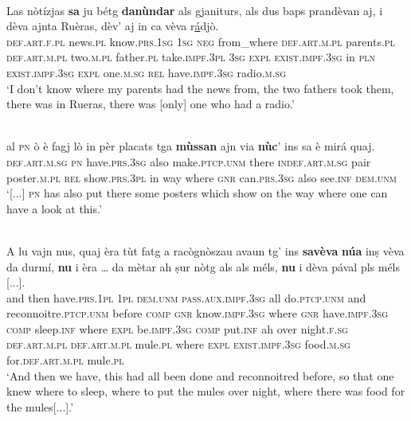 \ea
\label{ex:indinterr3}
\\
\gll    Las nòtízjas \textbf{sa} ju bétg \textbf{danùndar} als gjaniturs, als dus baps prandèvan aj, i dèva ajnta Ruèras, dèv’ aj in ca vèva r\underline{á}djò. \\
\textsc{def.art.f.pl} news.\textsc{pl} know.\textsc{prs.1sg} \textsc{1sg} \textsc{neg} from\_where \textsc{def.art.m.pl} parents.\textsc{pl} \textsc{def.art.m.pl} two.\textsc{m.pl} father.\textsc{pl} take.\textsc{impf.3pl} \textsc{3sg} \textsc{expl} \textsc{exist.impf.3sg} in \textsc{pln} \textsc{exist.impf.3sg} \textsc{expl}  one.\textsc{m.sg} \textsc{rel} have.\textsc{impf.3sg} radio.\textsc{m.sg}\\
\glt `I don’t know where my parents had the news from, the two fathers took them, there was in Rueras, there was [only] one who had a radio.'
\z

\ea
\label{ex:indinterr4}
\\
\gll [...] al \textsc{pn} ò è fagj lò in pèr placats tga \textbf{mùssan} ajn via \textbf{nùc}’ ins sa è mirá quaj.\\
{} \textsc{def.art.m.sg} \textsc{pn} have.\textsc{prs.3sg} also make.\textsc{ptcp.unm} there \textsc{indef.art.m.sg} pair poster.\textsc{m.pl} \textsc{rel} show.\textsc{prs.3pl} in way where \textsc{gnr} can.\textsc{prs.3sg} also see.\textsc{inf} \textsc{dem.unm} \\
\glt `[...] \textsc{pn} has also put there some posters which show on the way where one can have a look at this.'
\z

\ea
\label{ex:indinterr5}
\\
\gll A lu vajn nus, quaj èra tùt fatg a racògnòszau avaun tg’ ins \textbf{savèva} \textbf{núa} inṣ vèva da durmí, \textbf{nu} i èra … da mètar ah ṣur nòtg als als méls, \textbf{nu} i dèva pával pls méls [...]. \\
and then have.\textsc{prs.1pl} \textsc{1pl} \textsc{dem.unm} \textsc{pass.aux.impf.3sg} all do.\textsc{ptcp.unm} and  reconnoitre.\textsc{ptcp.unm} before \textsc{comp} \textsc{gnr}  know.\textsc{impf.3sg} where \textsc{gnr} have.\textsc{impf.3sg} \textsc{comp} sleep.\textsc{inf} where \textsc{expl} be.\textsc{impf.3sg} {} \textsc{comp} put.\textsc{inf} ah over night.\textsc{f.sg} \textsc{def.art.m.pl} \textsc{def.art.m.pl} mule.\textsc{pl} where \textsc{expl} \textsc{exist.impf.3sg} food.\textsc{m.sg} for.\textsc{def.art.m.pl} mule.\textsc{pl}\\
\glt `And then we have, this had all been done and reconnoitred before, so that one knew where to sleep, where to put the mules over night, where there was food for the mules[...].'
\z

